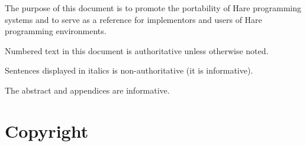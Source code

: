 
\specitem
The purpose of this document is to promote the portability of Hare programming
systems and to serve as a reference for implementors and users of Hare
programming environments.

\specitem
Numbered text in this document is authoritative unless otherwise noted.

\specitem
Sentences displayed in italics is non-authoritative (it is informative).


\specitem
The abstract and appendices are informative.

\section{Copyright}

